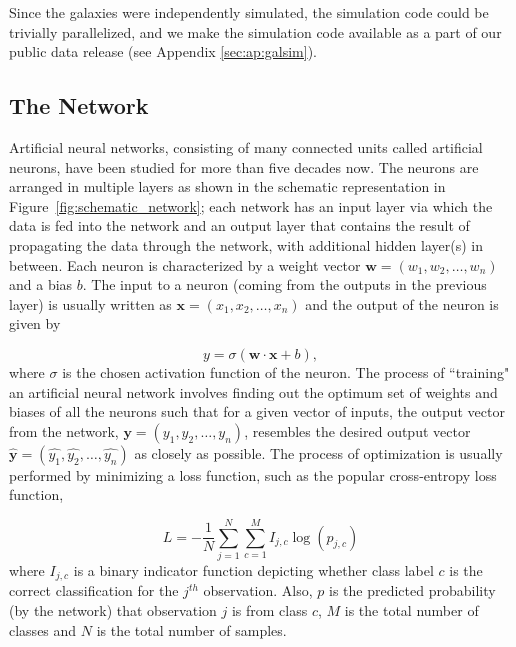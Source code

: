 Since the galaxies were independently simulated, the simulation code could be trivially parallelized, and we make the simulation code available as a part of our public data release (see Appendix \ref{sec:ap:galsim}).


\subsection{The Network} \label{sec:network_description}
Artificial neural networks, consisting of many connected units called artificial neurons, have been studied for more than five decades now. The neurons are arranged in multiple layers as shown in the schematic representation in Figure~\ref{fig:schematic_network}; each network has an input layer via which the data is fed into the network and an output layer that contains the result of propagating the data through the network, with additional hidden layer(s) in between. Each neuron is characterized by a weight vector $\bm{w}=(w_1,w_2,\ldots,w_n)$ and a bias $b$. The input to a neuron (coming from the outputs in the previous layer) is usually written as $\bm{x}=(x_1,x_2,\ldots,x_n)$ and the output of the neuron is given by 

\begin{equation}
y = \sigma(\bm{w} \cdot \bm{x} + b) ,
\label{eq:neuron_output}
\end{equation}
where $\sigma$ is the chosen activation function of the neuron. The process of ``training" an artificial neural network involves finding out the optimum set of weights and biases of all the neurons such that for a given vector of inputs, the output vector from the network, $\bm{y} = (y_1,y_2,\ldots,y_n)$, resembles the desired output vector $\bm{\hat{y}}=(\hat{y_1},\hat{y_2},\ldots,\hat{y_n})$ as closely as possible. The process of optimization is usually performed by minimizing a loss function, such as the popular cross-entropy loss function,

\begin{equation}
L = -\frac{1}{N}\sum_{j=1}^N \sum_{c=1}^M I_{j,c} \log(p_{j,c}) 
\label{eq:cross_entr_loss}
\end{equation}
where $I_{j,c}$ is a binary indicator function depicting whether class label $c$ is the correct classification for the $j^{th}$ observation. Also, $p$ is the predicted probability (by the network) that observation $j$ is from class $c$, $M$ is the total number of classes and $N$ is the total number of samples. 

